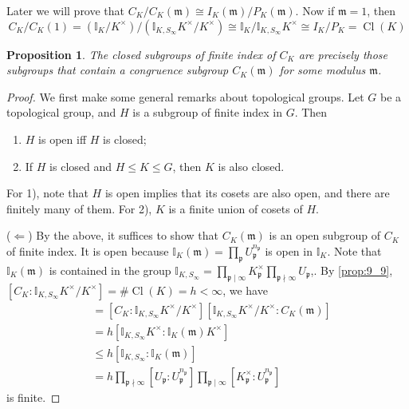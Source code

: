 \documentclass[11pt]{article}
\theoremstyle{definition}
\theoremstyle{plain}
\newtheorem{proposition}[definition]{Proposition}
\theoremstyle{remark}
\DeclareMathOperator{\Cl}{Cl}
\newcommand{\II}{\mathbb{I}}
\newcommand{\fp}{\mathfrak{p}}
\newcommand{\fm}{\mathfrak{m}}
\begin{document}
Later we will prove that $C_K / C_K(\fm) \cong I_K(\fm) / P_K(\fm)$. Now if $\fm = 1$, then
\begin{equation*}
    C_K / C_K(1) = (\II_K / K^\times) / (\II_{K, S_\infty} K^\times / K^\times) \cong \II_K / \II_{K, S_\infty} K^\times \cong I_K / P_K = \Cl(K)
\end{equation*}

\begin{proposition}\label{prop:9_17}
    The closed subgroups of finite index of $C_K$ are precisely those subgroups that contain a congruence subgroup $C_K(\fm)$ for some modulus $\fm$.
\end{proposition}
\begin{proof}
    We first make some general remarks about topological groups. Let $G$ be a topological group, and $H$ is a subgroup of finite index in $G$. Then
    \begin{enumerate}
        \item $H$ is open iff $H$ is closed;
        \item If $H$ is closed and $H \le K \le G$, then $K$ is also closed.
    \end{enumerate}
    For 1), note that $H$ is open implies that its cosets are also open, and there are finitely many of them. For 2), $K$ is a finite union of cosets of $H$.

    ($\Leftarrow$) By the above, it suffices to show that $C_K(\fm)$ is an open subgroup of $C_K$ of finite index. It is open because $\II_K(\fm) = \prod_{\fp} U_\fp^{n_\fp}$ is open in $\II_K$. Note that $\II_K(\fm)$ is contained in the group $\II_{K,S_\infty} = \prod_{\fp \mid \infty} K_\fp^\times \prod_{\fp \nmid \infty} U_\fp$,. By \autoref{prop:9_9}, $[C_K : \II_{K, S_\infty} K^\times / K^\times] = \# \Cl(K) = h < \infty$, we have
    \begin{align*}
        [C_K : C_K(\fm)]
        &= [C_K : \II_{K, S_\infty} K^\times / K^\times] [\II_{K, S_\infty} K^\times / K^\times : C_K(\fm)]\\
        &= h [\II_{K, S_\infty} K^\times : \II_K(\fm) K^\times]\\
        &\le h [\II_{K, S_\infty} : \II_K(\fm)]\\
        &= h \prod_{\fp \nmid \infty} [U_\fp : U_\fp^{n_\fp}] \prod_{\fp \mid \infty} [K_\fp^\times : U_\fp^{n_\fp}]
    \end{align*}
    is finite.


\end{proof}
\end{document}
